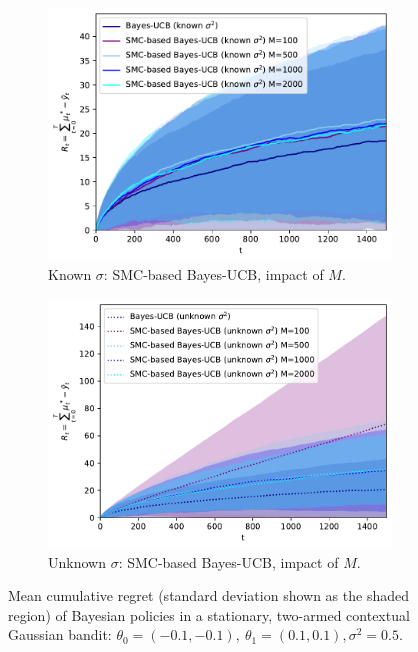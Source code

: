 \begin{figure}[!h]
	\begin{subfigure}[b]{0.46\textwidth}
		\centering
		\includegraphics[width=\textwidth]{./fods_figs/static/linear_gaussian/A2/theta-0.1_-0.1_0.1_0.1_sigma0.5_0.5_allM_cumulative_regret_bucb_knownsigma}
		\caption{Known $\sigma$: SMC-based Bayes-UCB, impact of $M$.}
	\end{subfigure}
	\begin{subfigure}[b]{0.46\textwidth}
		\centering
		\includegraphics[width=\textwidth]{./fods_figs/static/linear_gaussian/A2/theta-0.1_-0.1_0.1_0.1_sigma0.5_0.5_allM_cumulative_regret_bucb_unknownsigma}
		\caption{Unknown $\sigma$: SMC-based Bayes-UCB, impact of $M$.}
	\end{subfigure}
	
	\caption{Mean cumulative regret (standard deviation shown as the shaded region) of Bayesian policies in a stationary, two-armed contextual Gaussian bandit:
		$\theta_0=(-0.1,-0.1), \ \theta_1=(0.1,0.1), \sigma^2=0.5$.}
\end{figure}


